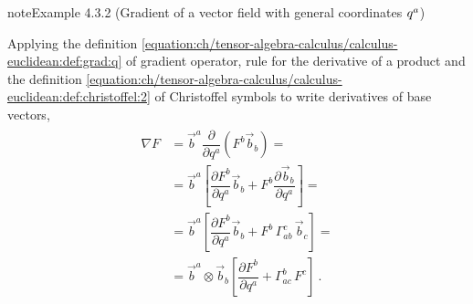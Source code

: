 \documentclass[letterpaper,10pt,english]{jupyterBook}
\begin{document}
\begin{sphinxadmonition}{note}{Example 4.3.2 (Gradient of a vector field \sphinxhyphen{} with general coordinates \protect\(q^{a}\protect\))}



\sphinxAtStartPar
Applying the definition \eqref{equation:ch/tensor-algebra-calculus/calculus-euclidean:def:grad:q} of gradient operator, rule for the derivative of a product and the definition \eqref{equation:ch/tensor-algebra-calculus/calculus-euclidean:def:christoffel:2} of Christoffel symbols to write derivatives of base vectors,
\begin{equation*}
\begin{split}\begin{aligned}
  \nabla F 
  & = \vec{b}^a \dfrac{\partial}{\partial q^a} \left( F^b \vec{b}_b \right) = \\
  & = \vec{b}^a \left[ \dfrac{\partial F^b}{\partial q^a} \vec{b}_b + F^b \dfrac{\partial \vec{b}_b}{\partial q^a} \right] = \\
  & = \vec{b}^a \left[ \dfrac{\partial F^b}{\partial q^a} \vec{b}_b + F^b \, \Gamma_{ab}^c \, \vec{b}_c \right] = \\
  & = \vec{b}^a \otimes \vec{b}_b \left[ \dfrac{\partial F^b}{\partial q^a} + \Gamma_{ac}^b \, F^c \right] \ .
\end{aligned}\end{split}
\end{equation*}\end{sphinxadmonition}
\label{ch/tensor-algebra-calculus/calculus-euclidean:example-6}
\end{document}

